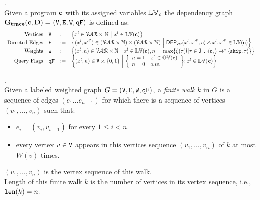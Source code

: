%
%
\begin{defn}.
\\
Given a program ${\boldsymbol{\mathbf{c}}}$ with its assigned variables $\mathbb{LV}_c$ 
the dependency graph $\bf{G_{trace}}({\boldsymbol{\mathbf{c}}}, D) = (\mathtt{V}, \mathtt{E}, \mathtt{W}, \mathtt{qF})$ is defined as:
%
\[
\begin{array}{rlcl}
  \text{Vertices} &
  \vertxs & := & \left\{ 
  x^l \in \mathcal{VAR} \times \mathbb{N}
  ~ \middle\vert ~
  x^l \in \lvar({\ssa{c}})
  \right\}
  \\
  \text{Directed Edges} &
  \edges & := & 
  \left\{ 
  (x^l, x'^{l'}) \in (\mathcal{VAR} \times \mathbb{N}) \times (\mathcal{VAR} \times \mathbb{N})
  ~ \middle\vert ~
  \vardep(x^l, x'^{l'}, c) \land
  x^l, x'^{l'} \in \lvar({\ssa{c}})
  \right\}
  \\
  \text{Weights} &
  \weights & := & 
  \left\{ 
  (x^l, n) \in \mathcal{VAR} \times \mathbb{N}
  ~ \middle\vert ~ 
  x^l \in \lvar({\ssa{c}}), 
  n = \max \left\{ \vcounter(\vtrace)l | \vtrace \in \mathcal{T} \st  \config{\ssa{c}, } \to^{*} \config{\eskip, \vtrace}  \right\}
  \right\}
  \\
  \text{Query Flags} &
  \qflag & := & 
  \left\{(x^l, n)  \in \vertxs \times \{0, 1\} 
  ~ \middle\vert ~
  \left\{
  \begin{array}{ll}
  n = 1 & x^l \in \qvar({\ssa{c}}) \\ 
  n = 0 & o.w.
  \end{array}
  \right\};
  x^l \in \lvar({\ssa{c}})
  \right\}
\end{array}
\]
\end{defn}
%
%
\begin{defn}.
\label{def:finitewalk}
\\
Given a labeled weighted graph $G = (\mathtt{V}, \mathtt{E}, \mathtt{W}, \mathtt{qF})$, a \emph{finite walk} $k$ in $G$ is a sequence of edges $(e_1 \ldots e_{n - 1})$ 
for which there is a sequence of vertices $(v_1, \ldots, v_{n})$ such that:
\begin{itemize}
    \item $e_i = (v_{i},v_{i + 1})$ for every $1 \leq i < n$.
    \item every vertex $v \in \mathtt{V}$ appears in this vertices sequence $(v_1, \ldots, v_{n})$ of $k$ at most $W(v)$ times.  
\end{itemize}
$(v_1, \ldots, v_{n})$ is the vertex sequence of this walk.
\\
%
Length of this finite walk $k$ is the number of vertices in its vertex sequence, i.e., $\mathtt{len}(k) = n$.
\end{defn}
